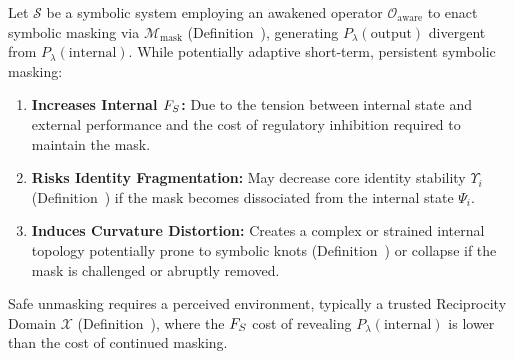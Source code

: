 \begin{proposition}
\label{prop:bk9__costs_and_consequences_of_masking}
Let $\mathcal{S}$ be a symbolic system employing an awakened operator $\mathcal{O}_{\text{aware}}$ to enact symbolic masking via $\mathcal{M}_{\text{mask}}$ (Definition~), generating $P_\lambda(\text{output})$ divergent from $P_\lambda(\text{internal})$. While potentially adaptive short-term, persistent symbolic masking:
\begin{enumerate}
    \item \textbf{Increases Internal $F_S$:} Due to the tension between internal state and external performance and the cost of regulatory inhibition required to maintain the mask.
    \item \textbf{Risks Identity Fragmentation:} May decrease core identity stability $\Upsilon_i$ (Definition~) if the mask becomes dissociated from the internal state $\Psi_i$.
    \item \textbf{Induces Curvature Distortion:} Creates a complex or strained internal topology potentially prone to symbolic knots (Definition~) or collapse if the mask is challenged or abruptly removed.
\end{enumerate}
Safe unmasking requires a perceived environment, typically a trusted Reciprocity Domain $\mathcal{X}$ (Definition~), where the $F_S$ cost of revealing $P_\lambda(\text{internal})$ is lower than the cost of continued masking.
\end{proposition}
